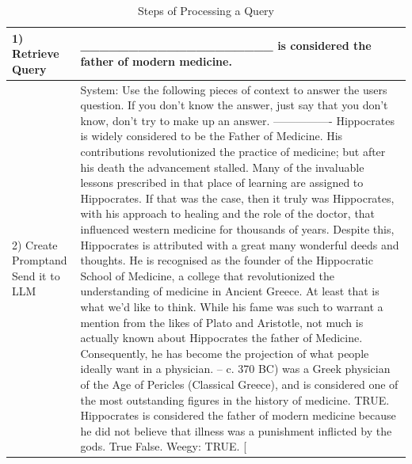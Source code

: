 \documentclass[conference]{IEEEtran}
\begin{document}
\iffalse
\begin{table}
    \centering
    \caption{Steps of Processing a Query}
    \label{tab:the_table}
    \begin{tabular}{|p{30mm}|p{130mm}|}
        \hline
        1) Retrieve Query & \_\_\_\_\_\_\_\_\_\_\_\_\_\_\_\_\_\_\_\_ is considered the father of modern medicine.  \\
        \hline
        2) Create Prompt\newline and Send it to LLM & System: Use the following pieces of context to answer the users question. 
If you don't know the answer, just say that you don't know, don't try to make up an answer.\newline
----------------\newline
Hippocrates is widely considered to be the Father of Medicine. His contributions revolutionized the practice of medicine; but after his death the advancement stalled.\newline
\newline
Many of the invaluable lessons prescribed in that place of learning are assigned to Hippocrates. If that was the case, then it truly was Hippocrates, with his approach to healing and the role of the doctor, that influenced western medicine for thousands of years.\newline
\newline
Despite this, Hippocrates is attributed with a great many wonderful deeds and thoughts. He is recognised as the founder of the Hippocratic School of Medicine, a college that revolutionized the understanding of medicine in Ancient Greece.\newline
\newline
At least that is what we’d like to think. While his fame was such to warrant a mention from the likes of Plato and Aristotle, not much is actually known about Hippocrates the father of Medicine. Consequently, he has become the projection of what people ideally want in a physician.\newline
\newline
460 – c. 370 BC) was a Greek physician of the Age of Pericles (Classical Greece), and is considered one of the most outstanding figures in the history of medicine.\newline
\newline
TRUE. Hippocrates is considered the father of modern medicine because he did not believe that illness was a punishment inflicted by the gods. True False. Weegy: TRUE. [ \newline

\end{tabular}
\end{table}
\end{document}
